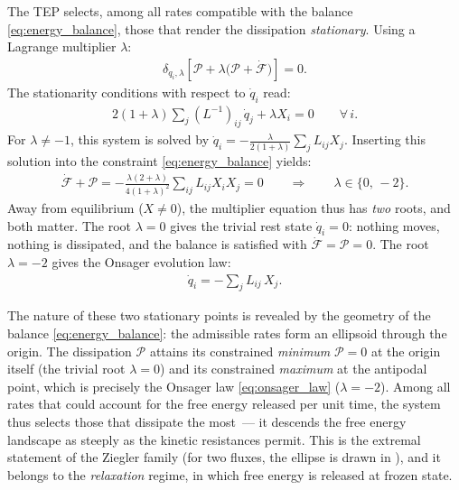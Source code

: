 \documentclass[aip,pof,reprint,amsmath,amssymb,longbibliography]{revtex4-2}
\begin{document}
The TEP selects, among all rates compatible with the balance \eqref{eq:energy_balance}, those that render the dissipation \textit{stationary}. Using a Lagrange multiplier $\lambda$:
\begin{align}
    \delta_{\dot{q}_i,\lambda} \left[ \mathcal{P} + \lambda \big( \mathcal{P} + \dot{\mathcal{F}} \big) \right] = 0. \label{eq:tep_constrained}
\end{align}
The stationarity conditions with respect to $\dot{q}_i$ read:
\begin{align}
    2(1+\lambda) \sum_j (L^{-1})_{ij}\, \dot{q}_j + \lambda X_i = 0 \qquad \forall\, i. \label{eq:stationarity}
\end{align}
For $\lambda \neq -1$, this system is solved by $\dot{q}_i = -\frac{\lambda}{2(1+\lambda)} \sum_j L_{ij} X_j$. Inserting this solution into the constraint \eqref{eq:energy_balance} yields:
\begin{align}
    \dot{\mathcal{F}} + \mathcal{P} = -\frac{\lambda(2+\lambda)}{4(1+\lambda)^2} \sum_{ij} L_{ij} X_i X_j = 0
    \qquad \Longrightarrow \qquad \lambda \in \{0,\, -2\}. \label{eq:lambda}
\end{align}
Away from equilibrium ($X \neq 0$), the multiplier equation thus has \textit{two} roots, and both matter. The root $\lambda = 0$ gives the trivial rest state $\dot{q}_i = 0$: nothing moves, nothing is dissipated, and the balance is satisfied with $\dot{\mathcal{F}} = \mathcal{P} = 0$. The root $\lambda = -2$ gives the Onsager evolution law:
\begin{align}
    \dot{q}_i = -\sum_j L_{ij}\, X_j. \label{eq:onsager_law}
\end{align}

The nature of these two stationary points is revealed by the geometry of the balance \eqref{eq:energy_balance}: the admissible rates form an ellipsoid through the origin. The dissipation $\mathcal{P}$ attains its constrained \textit{minimum} $\mathcal{P} = 0$ at the origin itself (the trivial root $\lambda = 0$) and its constrained \textit{maximum} at the antipodal point, which is precisely the Onsager law \eqref{eq:onsager_law} ($\lambda = -2$). Among all rates that could account for the free energy released per unit time, the system thus selects those that dissipate the most~--- it descends the free energy landscape as steeply as the kinetic resistances permit. This is the extremal statement of the Ziegler family \cite{ziegler1963, hackl2008} (for two fluxes, the ellipse is drawn in \cite[Fig.~1]{svoboda2023note}), and it belongs to the \textit{relaxation} regime, in which free energy is released at frozen state.
\end{document}
